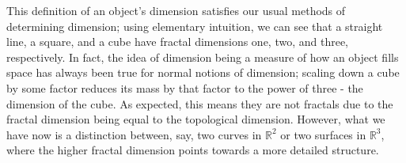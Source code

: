 This definition of an object's dimension satisfies our usual methods of determining dimension; using elementary intuition, we can see that a straight line, a square, and a cube have fractal dimensions one, two, and three, respectively. In fact, the idea of dimension being a measure of how an object fills space has always been true for normal notions of dimension; scaling down a cube by some factor reduces its mass by that factor to the power of three - the dimension of the cube. As expected, this means they are not fractals due to the fractal dimension being equal to the topological dimension. However, what we have now is a distinction between, say, two curves in $\mathbb{R}^2$ or two surfaces in $\mathbb{R}^3$, where the higher fractal dimension points towards a more detailed structure.
    

